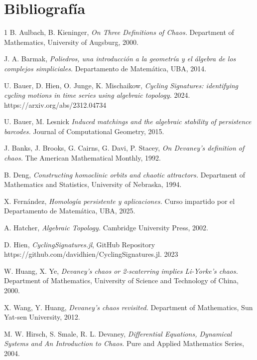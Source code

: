 \documentclass[12pt,a4paper]{article}
\begin{document}
\section{Bibliografía}
\renewcommand{\refname}{}
\begin{thebibliography}{1}
B. Aulbach, B. Kieninger,
\textit{On Three Definitions of Chaos.} Department of Mathematics, University of Augsburg, 2000.

J. A. Barmak,
\textit{Poliedros, una introducción a la geometría y el álgebra de los complejos simpliciales.} Departamento de Matemática, UBA, 2014.

U. Bauer, D. Hien, O. Junge, K. Mischaikow,
\textit{Cycling Signatures: identifying cycling motions in time series using algebraic topology.} 2024. 
https://arxiv.org/abs/2312.04734

U. Bauer, M. Lesnick
\textit{Induced matchings and the algebraic stability of persistence barcodes.} Journal of Computational Geometry, 2015.

J. Banks, J. Brooks, G. Cairns, G. Davi, P. Stacey,
\textit{On Devaney's definition of chaos.} The American Mathematical Monthly, 1992.

B. Deng,
\textit{Constructing homoclinic orbits and chaotic attractors.} Department of Mathematics and Statistics, University of Nebraska, 1994.

X. Fernández,
\textit{Homología persistente y aplicaciones.} Curso impartido por el Departamento de Matemática, UBA, 2025.

A. Hatcher,
\textit{Algebraic Topology.} Cambridge University Press, 2002.

D. Hien,
\textit{CyclingSignatures.jl}, GitHub Repository https://github.com/davidhien/CyclingSignatures.jl. 2023

W. Huang, X. Ye,
\textit{Devaney's chaos or 2-scaterring implies Li-Yorke's chaos.} Department of Mathematics, University of Science and Technology of China, 2000.

X. Wang, Y. Huang,
\textit{Devaney's chaos revisited.} Department of Mathematics, Sun Yat-sen University, 2012.

M. W. Hirsch, S. Smale, R. L. Devaney,
\textit{Differential Equations, Dynamical Systems and An Introduction to Chaos.} Pure and Applied Mathematics Series, 2004.


\end{thebibliography}
\end{document}

